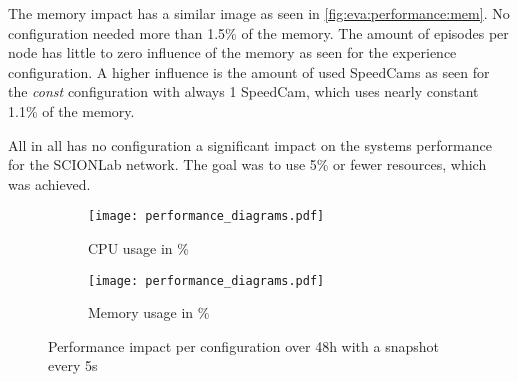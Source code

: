 \documentclass[thesis.tex]{subfiles}
\begin{document}
The memory impact has a similar image as seen in \autoref{fig:eva:performance:mem}. No configuration needed more than 1.5\% of the memory. The amount of episodes per node has little to zero influence of the memory as seen for the experience configuration. A higher influence is the amount of used SpeedCams as seen for the \textit{const} configuration with always 1 SpeedCam, which uses nearly constant 1.1\% of the memory.

All in all has no configuration a significant impact on the systems performance for the SCIONLab network. The goal was to use 5\% or fewer resources, which was achieved.
\begin{figure}
	\centering
	\begin{subfigure}{0.8\linewidth}
		\centering
		\texttt{[image: performance\_diagrams.pdf]}
		\caption{CPU usage in \%}
		\label{fig:eva:performance:cpu}
	\end{subfigure}
	\hfill
	\begin{subfigure}{0.8\linewidth}
		\centering
		\texttt{[image: performance\_diagrams.pdf]}
		\caption{Memory usage in \%}
		\label{fig:eva:performance:mem}
	\end{subfigure}
	\caption{Performance impact per configuration over 48h with a snapshot every 5s}
	\label{fig:eva:performance}
\end{figure}

\subfilebib %
\end{document}
